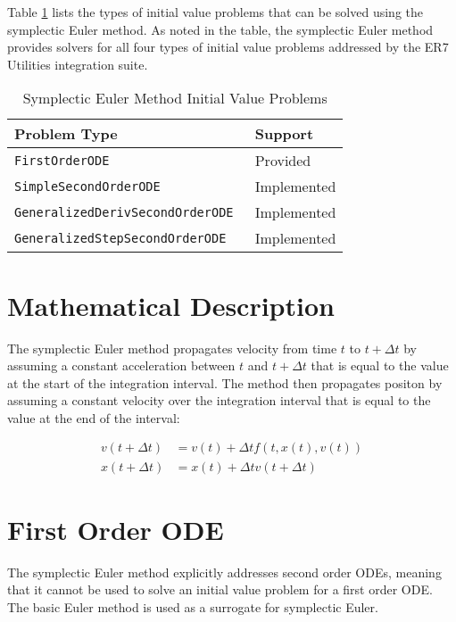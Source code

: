 Table \ref{tab:symplectic_euler_method_problems} lists the types of initial value problems
that can be solved using the symplectic Euler method.
As noted in the table, the symplectic Euler method provides
solvers for all four types of initial value problems addressed by the
ER7 Utilities integration suite.

\begin{table}[htp]
\centering
\caption{Symplectic Euler Method Initial Value Problems}
\label{tab:symplectic_euler_method_problems}
\vspace{1ex}
\begin{tabular}{ll}\hline
\bf{Problem Type} & \bf{Support} \\
\hline\hline
\tt{FirstOrderODE} & Provided \\
\tt{SimpleSecondOrderODE} & Implemented \\
\tt{GeneralizedDerivSecondOrderODE} & Implemented \\
\tt{GeneralizedStepSecondOrderODE} & Implemented \\
\hline
\end{tabular}
\end{table}

\section{Mathematical Description}

The symplectic Euler method propagates velocity from time $t$ to $t+\Delta t$
by assuming a constant acceleration between $t$ and $t+\Delta t$
that is equal to the value at the start of the integration interval.
The method then propagates positon by assuming a constant velocity over the
integration interval that is equal to the value at the end of the interval:

\begin{equation}
\label{eqn:symplectic_euler_scalar_2nd_order_ode_step}
\begin{split}
v(t+\Delta t) &= v(t) + \Delta t f(t, x(t), v(t)) \\
x(t+\Delta t) &= x(t) + \Delta t v(t+\Delta t)
\end{split}
\end{equation}

\section{First Order ODE}

The symplectic Euler method explicitly addresses second order ODEs,
meaning that it cannot be used to solve an initial value problem
for a first order ODE.
The basic Euler method is used as a surrogate for symplectic
Euler.

